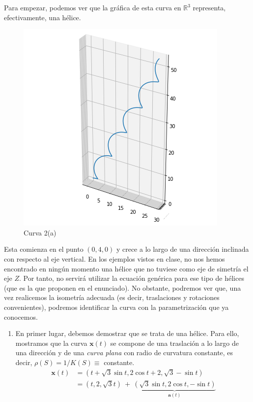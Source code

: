 \begin{enumerate}
    Para empezar, podemos ver que la gráfica de esta curva en $\mathbb{R}^3$ representa, efectivamente, una hélice.

    \begin{figure}[!h]
        \centering
        \includegraphics[scale=.5]{FOTOS/2_a.png}
        \caption*{Curva 2(a)}
        \label{fig:2a}
    \end{figure}

    Esta comienza en el punto $(0,4,0)$ y crece a lo largo de una dirección inclinada con respecto al eje vertical. En los ejemplos vistos en clase, no nos hemos encontrado en ningún momento una hélice que no tuviese como eje de simetría el eje $Z$. Por tanto, no servirá utilizar la ecuación genérica para ese tipo de hélices (que es la que proponen en el enunciado). No obstante, podremos ver que, una vez realicemos la isometría adecuada (es decir, traslaciones y rotaciones convenientes), podremos identificar la curva con la parametrización que ya conocemos. \\

    \begin{enumerate}
        \item En primer lugar, debemos demostrar que se trata de una hélice. Para ello, mostramos que la curva $\mathbf{x}(t)$ se compone de una traslación a lo largo de una dirección y de una \emph{curva plana} con radio de curvatura constante, es decir, $\rho(S)=1/K(S)\equiv$ constante. 
        \begin{equation*}
        \begin{split}
        \mathbf{x}(t)&=(t+ \sqrt{3}\sin t,2\cos t +2, \sqrt{3}-\sin t)\\
                 &=(t,2,\sqrt{3}t) \ +\ \underbrace{(\sqrt{3}\sin t,2\cos t, -\sin t)}_{\mathbf{a}(t)}
        \end{split}
        \end{equation*}


\end{enumerate}
\end{enumerate}
